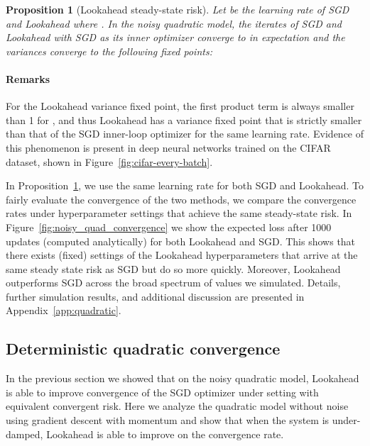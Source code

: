 \documentclass{article}
\newtheorem{proposition}{Proposition}
\begin{document}
\begin{proposition}[Lookahead steady-state risk]\label{prop:noisy_quad}
Let  be the learning rate of SGD and Lookahead where . In the noisy quadratic model, the iterates of SGD and Lookahead with SGD as its inner optimizer converge to  in expectation and the variances converge to the following fixed points:

\end{proposition}


\paragraph{Remarks}For the Lookahead variance fixed point, the first product term is always smaller than 1 for , and thus Lookahead has a variance fixed point that is strictly smaller than that of the SGD inner-loop optimizer for the same learning rate. Evidence of this phenomenon is present in deep neural networks trained on the CIFAR dataset, shown in Figure~\ref{fig:cifar-every-batch}.



In Proposition~\ref{prop:noisy_quad}, we use the same learning rate for both SGD and Lookahead. To fairly evaluate the convergence of the two methods, we compare the convergence rates under hyperparameter settings that achieve the same steady-state risk. In Figure~\ref{fig:noisy_quad_convergence} we show the expected loss after 1000 updates (computed analytically) for both Lookahead and SGD. This shows that there exists (fixed) settings of the Lookahead hyperparameters that arrive at the same steady state risk as SGD but do so more quickly. Moreover, Lookahead outperforms SGD across the broad spectrum of  values we simulated. Details, further simulation results, and additional discussion are presented in Appendix~\ref{app:quadratic}.



 \subsection{Deterministic quadratic convergence}

In the previous section we showed that on the noisy quadratic model, Lookahead is able to improve convergence of the SGD optimizer under setting with equivalent convergent risk. Here we analyze the quadratic model without noise using gradient descent with momentum \citep{polyak1964some, goh2017why} and show that when the system is under-damped, Lookahead is able to improve on the convergence rate.
\end{document}
